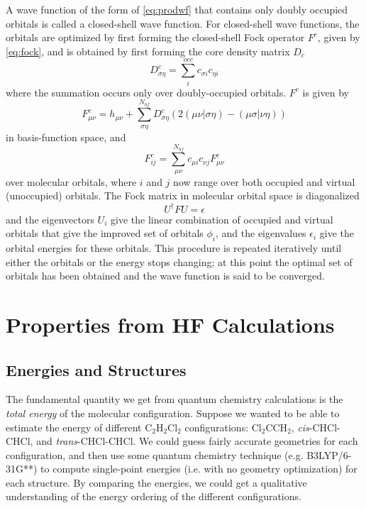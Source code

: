 A wave function of the form of \ref{eq:prodwf} that contains only
doubly occupied orbitals is called a closed-shell wave function. For
closed-shell wave functions, the orbitals are optimized by first
forming the closed-shell Fock operator $F^c$, given by
\ref{eq:fock}, and is obtained by first forming the core density
matrix $D_c$ 
\begin{equation} 
  D_{\sigma\eta}^c = \sum_i^{occ}c_{\sigma i}c_{\eta i}
\end{equation}
where the summation occurs only over doubly-occupied
orbitals. $F^c$ is given by
\begin{equation}
  F_{\mu\nu}^c = h_{\mu\nu} + \sum_{\sigma\eta}^{N_{bf}}
	D_{\sigma\eta}^c\left(2(\mu\nu|\sigma\eta) -
	(\mu\sigma|\nu\eta)\right)
\end{equation}
in basis-function space, and
\begin{equation}
  F_{ij}^c = \sum_{\mu\nu}^{N_{bf}}c_{\mu i}c_{\nu j}F_{\mu\nu}^c
\end{equation}
over molecular orbitals, where $i$ and $j$ now range over
both occupied and virtual (unoccupied) orbitals. The Fock matrix in
molecular orbital space is diagonalized
\begin{equation}
	U^\dagger F U = \epsilon
\end{equation}
and the eigenvectors ${U_i}$ give the linear combination of
occupied and virtual orbitals that give the improved set of orbitals
${\phi_i}$, and the eigenvalues $\epsilon_i$ give the orbital energies
for these orbitals. This procedure is repeated iteratively until
either the orbitals or the energy stops changing; at this point the
optimal set of orbitals has been obtained and the wave function is
said to be converged.

\section{Properties from HF Calculations}
\label{sec:hfprops}
\subsection{Energies and Structures}
The fundamental quantity we get from quantum chemistry calculations is
the \emph{total energy} of the molecular configuration. Suppose we
wanted to be able to estimate the energy of different C$_2$H$_2$Cl$_2$
configurations: Cl$_2$CCH$_2$, \emph{cis}-CHCl-CHCl, and
\emph{trans}-CHCl-CHCl. We could guess fairly accurate geometries for
each configuration, and then use some quantum chemistry technique
(e.g. B3LYP/6-31G**) to compute single-point energies
(i.e. with no geometry optimization) for each structure. By comparing
the energies, we could get a qualitative understanding of the energy
ordering of the different configurations.

